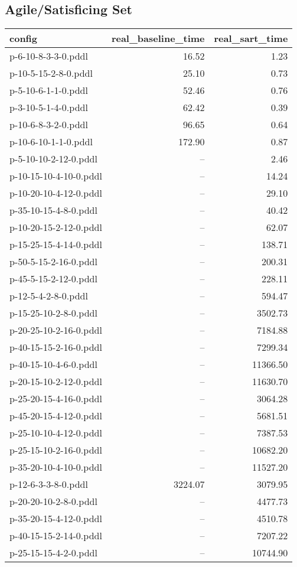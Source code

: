 \documentclass{article}
\begin{document}
                    \subsection*{Agile/Satisficing Set}
                    
                            \begin{center}
                            \scriptsize
                            \begin{tabular}{@{}l|r|r@{}}
                            config & real\_baseline\_time & real\_sart\_time\\\midrule
                             p-6-10-8-3-3-0.pddl&16.52&1.23\\
 p-10-5-15-2-8-0.pddl&25.10&0.73\\
 p-5-10-6-1-1-0.pddl&52.46&0.76\\
 p-3-10-5-1-4-0.pddl&62.42&0.39\\
 p-10-6-8-3-2-0.pddl&96.65&0.64\\
 p-10-6-10-1-1-0.pddl&172.90&0.87\\
 p-5-10-10-2-12-0.pddl&--&2.46\\
 p-10-15-10-4-10-0.pddl&--&14.24\\
 p-10-20-10-4-12-0.pddl&--&29.10\\
 p-35-10-15-4-8-0.pddl&--&40.42\\
 p-10-20-15-2-12-0.pddl&--&62.07\\
 p-15-25-15-4-14-0.pddl&--&138.71\\
 p-50-5-15-2-16-0.pddl&--&200.31\\
 p-45-5-15-2-12-0.pddl&--&228.11\\
 p-12-5-4-2-8-0.pddl&--&594.47\\
 p-15-25-10-2-8-0.pddl&--&3502.73\\
 p-20-25-10-2-16-0.pddl&--&7184.88\\
 p-40-15-15-2-16-0.pddl&--&7299.34\\
 p-40-15-10-4-6-0.pddl&--&11366.50\\
 p-20-15-10-2-12-0.pddl&--&11630.70\\
 p-25-20-15-4-16-0.pddl&--&3064.28\\
 p-45-20-15-4-12-0.pddl&--&5681.51\\
 p-25-10-10-4-12-0.pddl&--&7387.53\\
 p-25-15-10-2-16-0.pddl&--&10682.20\\
 p-35-20-10-4-10-0.pddl&--&11527.20\\
 p-12-6-3-3-8-0.pddl&3224.07&3079.95\\
 p-20-20-10-2-8-0.pddl&--&4477.73\\
 p-35-20-15-4-12-0.pddl&--&4510.78\\
 p-40-15-15-2-14-0.pddl&--&7207.22\\
 p-25-15-15-4-2-0.pddl&--&10744.90
                            \end{tabular}
                            \end{center}
                    
\end{document}

